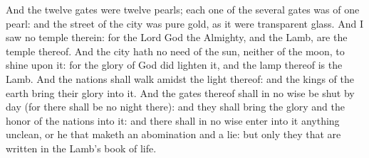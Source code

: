 And the twelve gates were twelve pearls; each one of the several gates was of one pearl: and the street of the city was pure gold, as it were transparent glass. And I saw no temple therein: for the Lord God the Almighty, and the Lamb, are the temple thereof. And the city hath no need of the sun, neither of the moon, to shine upon it: for the glory of God did lighten it, and the lamp thereof is the Lamb. And the nations shall walk amidst the light thereof: and the kings of the earth bring their glory into it. And the gates thereof shall in no wise be shut by day (for there shall be no night there): and they shall bring the glory and the honor of the nations into it: and there shall in no wise enter into it anything unclean, or he that maketh an abomination and a lie: but only they that are written in the Lamb’s book of life. 

